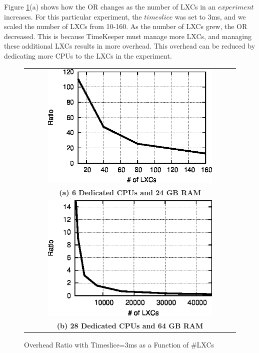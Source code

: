 Figure \ref{fig:overheadxn}(a) shows how the OR changes as the number of LXCs in an $experiment$ increases. For this particular experiment, the $timeslice$ was set to 3ms, and we scaled the number of LXCs from 10-160. As the number of LXCs grew, the OR decreased. This is because TimeKeeper must manage more LXCs, and managing these additional LXCs results in more overhead. This overhead can be reduced by dedicating more CPUs to the LXCs in the experiment. 

\begin{figure} \centering  
 \begin{tabular}{c} 
      \includegraphics[width=0.8\textwidth]{images/over_3ms_xn.eps} \\ 
      {\textbf{(a) 6 Dedicated CPUs and 24 GB RAM}}\label{subfig-1:over_small} \\ 
      \includegraphics[width=0.8\textwidth]{images/over_3ms_xn_large.eps} \\ 
      {\textbf{(b) 28 Dedicated CPUs and 64 GB RAM}}\label{subfig-2:over_large} 
  \end{tabular} 
    \caption{Overhead Ratio with Timeslice=3ms as a Function of \#LXCs} 
    \label{fig:overheadxn} 
  \end{figure} 

